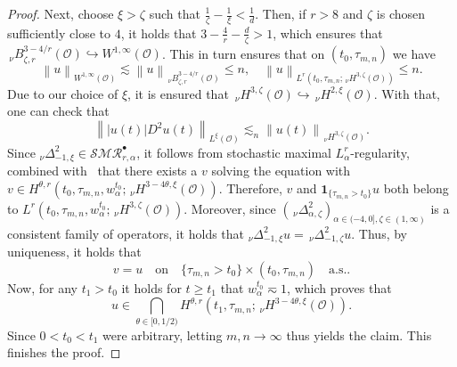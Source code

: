 \documentclass[reqno]{amsart}
\newcommand{\sO}{\mathscr{O}}
\newcommand{\1}{\mathbf{1}}
\newcommand{\nH}{\ensuremath{\,_\nu H}}
\newcommand{\bpsn}[1]{\ensuremath{\nH^{#1}(\sO)}}
\newcommand{\nrm}[1]{\left\lVert #1 \right\rVert}
\begin{document}
\begin{proof}
				Next, choose $\xi>\zeta$ such that $\frac{1}{\zeta}-\frac{1}{\xi}<\frac{1}{d}$. Then, if $r>8$ and $\zeta$ is chosen sufficiently close to $4$, it holds that $3-\frac{4}{r}-\frac{d}{\zeta}>1$, which ensures that $\,_\nu B^{3-4/r}_{\zeta,r}(\sO)\hookrightarrow W^{1,\infty}(\sO)$. This in turn ensures that on $(t_0,\tau_{m,n})$ we have  
				$$\nrm{u}_{W^{1,\infty}(\sO)}\lesssim \nrm{u}_{\,_\nu B^{3-4/r}_{\zeta,r}(\sO)} \le n, \quad \nrm{u}_{L^r(t_0,\tau_{m,n};\bpsn{3,\zeta})}\le n.$$ 
				Due to our choice of $\xi$, it is ensured that $\bpsn{3,\zeta}\hookrightarrow \bpsn{2,\xi}$. 
				With that, one can check that 
				\[\nrm{|u(t)|D^2u(t)}_{L^{\xi}(\sO)} \lesssim_n \nrm{u(t)}_{\bpsn{3,\zeta}}.\]
				Since $_\nu\Delta_{-1,\xi}^2 \in \mathcal{SMR}_{r,\alpha}^\bullet$, it follows from stochastic maximal $L^r_{\alpha}$-regularity, combined with~\cite[Proposition 3.11] {agrestiNonlinearSPDEsMaximal2025} that  there exists a $v$ solving the equation with
				$v\in H^{\theta,r}(t_0,\tau_{m,n}, w_\alpha^{t_0}; \bpsn{3-4\theta, \xi})$. Therefore,  $v$ and $\1_{\{\tau_{m,n}>t_0\}} u$ both belong to $L^r(t_0,\tau_{m,n},w_\alpha^{t_0};\bpsn{3,\zeta})$. Moreover, since   $(\,_\nu\Delta_{\alpha,\zeta}^2)_{\alpha\in(-4,0],\zeta\in(1,\infty)}$ is a consistent family of operators, it holds that $_\nu\Delta_{-1,\xi}^2 u = \,_\nu\Delta_{-1,\zeta}^2u$. Thus, by uniqueness, it holds that 
				$$v=u \quad \text{on}\quad \{\tau_{m,n}>t_0\}\times(t_0,\tau_{m,n}) \quad \text{a.s.}.$$
				Now, for any $t_1>t_0 $ it holds for $t\ge t_1$ that $w_\alpha^{t_0}\eqsim 1$, which proves that 
				$$u\in \bigcap_{\theta\in [0,1/2)} H^{\theta,r}(t_1,\tau_{m,n}; \bpsn{3-4\theta, \xi}).$$
				Since $0<t_0<t_1$ were arbitrary, letting $m,n\to\infty$ thus yields the claim. 
                This finishes the proof. 
	\end{proof}
\end{document}
